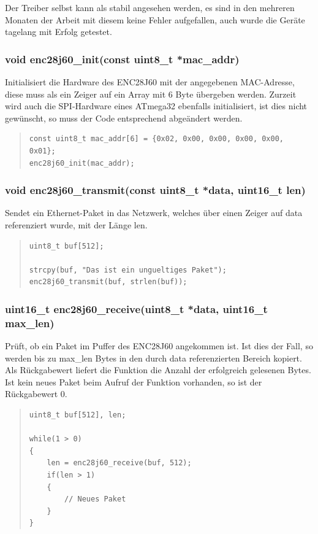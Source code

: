 \documentclass[a4paper,14pt,headsepline]{scrartcl}
\begin{document}
Der Treiber selbst kann als stabil angesehen werden, es sind in den mehreren Monaten der Arbeit mit diesem keine Fehler aufgefallen, auch wurde die Geräte tagelang mit Erfolg getestet.

\newpage

\subsubsection*{void enc28j60\_init(const uint8\_t *mac\_addr)}
Initialisiert die Hardware des ENC28J60 mit der angegebenen MAC-Adresse, diese muss als ein Zeiger auf ein Array mit 6 Byte übergeben werden. Zurzeit wird auch die SPI-Hardware eines ATmega32 ebenfalls initialisiert, ist dies nicht gewünscht, so muss der Code entsprechend abgeändert werden.

\begin{quote}
\begin{verbatim}
const uint8_t mac_addr[6] = {0x02, 0x00, 0x00, 0x00, 0x00, 0x01};
enc28j60_init(mac_addr);
\end{verbatim}
\end{quote}

\subsubsection*{void enc28j60\_transmit(const uint8\_t *data, uint16\_t len)}
Sendet ein Ethernet-Paket in das Netzwerk, welches über einen Zeiger auf data referenziert wurde, mit der Länge len.
\begin{quote}
\begin{verbatim}
uint8_t buf[512];

strcpy(buf, "Das ist ein ungueltiges Paket");
enc28j60_transmit(buf, strlen(buf));
\end{verbatim}
\end{quote}

\newpage

\subsubsection*{uint16\_t enc28j60\_receive(uint8\_t *data, uint16\_t max\_len)}
Prüft, ob ein Paket im Puffer des ENC28J60 angekommen ist. Ist dies der Fall, so werden bis zu max\_len Bytes in den durch data referenzierten Bereich kopiert. Als Rückgabewert liefert die Funktion die Anzahl der erfolgreich gelesenen Bytes. Ist kein neues Paket beim Aufruf der Funktion vorhanden, so ist der Rückgabewert 0.
\begin{quote}
\begin{verbatim}
uint8_t buf[512], len;

while(1 > 0)
{
    len = enc28j60_receive(buf, 512);
    if(len > 1)
    {
        // Neues Paket
    }
}
\end{verbatim}
\end{quote}
\end{document}
